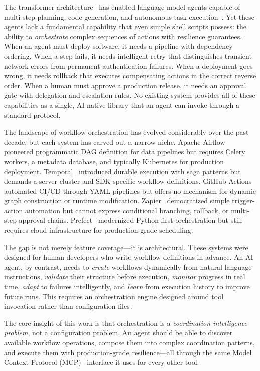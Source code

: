 \documentclass[10pt, twocolumn]{article}
\begin{document}
The transformer architecture~\cite{vaswani2017attention} has enabled language model agents capable of multi-step planning, code generation, and autonomous task execution~\cite{wei2022chain}. Yet these agents lack a fundamental capability that even simple shell scripts possess: the ability to \emph{orchestrate} complex sequences of actions with resilience guarantees. When an agent must deploy software, it needs a pipeline with dependency ordering. When a step fails, it needs intelligent retry that distinguishes transient network errors from permanent authentication failures. When a deployment goes wrong, it needs rollback that executes compensating actions in the correct reverse order. When a human must approve a production release, it needs an approval gate with delegation and escalation rules. No existing system provides all of these capabilities as a single, AI-native library that an agent can invoke through a standard protocol.

The landscape of workflow orchestration has evolved considerably over the past decade, but each system has carved out a narrow niche. Apache Airflow~\cite{airflow} pioneered programmatic DAG definition for data pipelines but requires Celery workers, a metadata database, and typically Kubernetes for production deployment. Temporal~\cite{temporal} introduced durable execution with saga patterns but demands a server cluster and SDK-specific workflow definitions. GitHub Actions~\cite{ghactions} automated CI/CD through YAML pipelines but offers no mechanism for dynamic graph construction or runtime modification. Zapier~\cite{zapier} democratized simple trigger-action automation but cannot express conditional branching, rollback, or multi-step approval chains. Prefect~\cite{prefect} modernized Python-first orchestration but still requires cloud infrastructure for production-grade scheduling.

The gap is not merely feature coverage---it is architectural. These systems were designed for human developers who write workflow definitions in advance. An AI agent, by contrast, needs to \emph{create} workflows dynamically from natural language instructions, \emph{validate} their structure before execution, \emph{monitor} progress in real time, \emph{adapt} to failures intelligently, and \emph{learn} from execution history to improve future runs. This requires an orchestration engine designed around tool invocation rather than configuration files.

The core insight of this work is that orchestration is a \emph{coordination intelligence problem}, not a configuration problem. An agent should be able to discover available workflow operations, compose them into complex coordination patterns, and execute them with production-grade resilience---all through the same Model Context Protocol (MCP)~\cite{mcp} interface it uses for every other tool.
\end{document}

